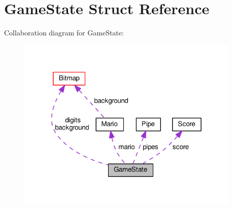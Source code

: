 \hypertarget{structGameState}{}\section{Game\+State Struct Reference}
\label{structGameState}


Collaboration diagram for Game\+State\+:
\nopagebreak
\begin{figure}[H]
\begin{center}
\leavevmode
\includegraphics[width=301pt]{structGameState__coll__graph}
\end{center}
\end{figure}
